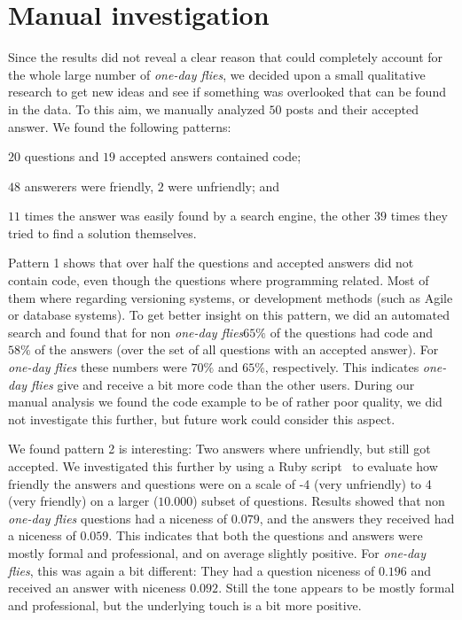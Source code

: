 \documentclass[conference]{IEEEtran}
\newcommand\odf{\emph{one-day flies}\xspace}
\begin{document}
\section{Manual investigation}\label{QualitativeResearch}
Since the results did not reveal a clear reason that could completely account
for the whole large number of \odf, we decided upon a small qualitative 
research to get new ideas and see if something was overlooked that can be found
in the data. To this aim, we manually analyzed $50$ posts and their
accepted answer. We found the following patterns:
\begin{inparaenum}[(1)]
\item $20$ questions and $19$ accepted answers contained code;
\item $48$ answerers were friendly, $2$ were unfriendly;
and \item $11$ times the answer was easily found by a search engine, the other
$39$ times they tried to find a solution themselves.
\end{inparaenum}

Pattern 1 shows that over half the questions and accepted answers
did not contain code, even though the questions where programming related. Most
of them where regarding versioning systems, or development methods (such as
Agile or database systems). To get better insight on this pattern, we did an
automated search and found that for non \odf $65\%$ of the
questions had code and $58\%$ of the answers (over the set of all questions
with an accepted answer). For \odf these numbers were $70\%$ and
$65\%$, respectively. This indicates \odf give and receive a bit more
code than the other users.
During our manual analysis we found the code example to be of rather poor
quality, we did not investigate this further, but future work could consider
this aspect.

We found pattern 2 is interesting: Two answers where unfriendly, but still got
accepted. We investigated this further by using a Ruby
script~\cite{nielsen2011new} to evaluate how friendly the answers and questions
were on a scale of -4 (very unfriendly) to 4 (very friendly) on a larger
($10.000$) subset of questions. Results showed that non \odf questions had a
niceness of $0.079$, and the answers they received had a niceness of $0.059$.
This indicates that both the questions and answers were mostly formal and
professional, and on average slightly positive. For \odf, this was again a bit
different: They had a question niceness of $0.196$ and received an answer with
niceness $0.092$. Still the tone appears to be mostly formal and professional,
but the underlying touch is a bit more positive.
\end{document}
